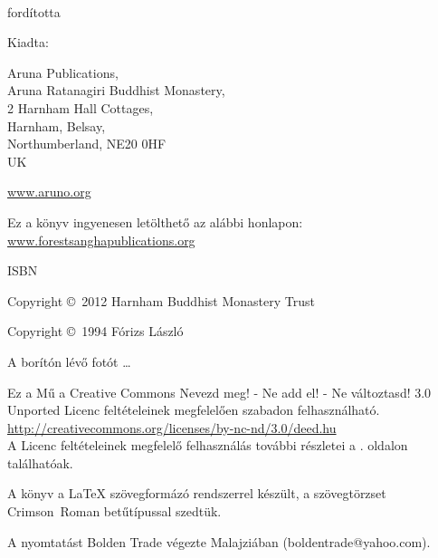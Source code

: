 {\small\setlength{\parskip}{0.8em}\setlength{\parindent}{0em}%
{\raggedright%

\thetitle\\
fordította \theauthor

Kiadta:

Aruna Publications,\\
Aruna Ratanagiri Buddhist Monastery,\\
2 Harnham Hall Cottages,\\
Harnham, Belsay,\\
Northumberland, NE20 0HF\\
UK

\href{http://aruno.org}{www.aruno.org}

Ez a könyv ingyenesen letölthető az alábbi honlapon:\\
\href{http://forestsanghapublications.org/}{www.forestsanghapublications.org}

ISBN \theISBN

Copyright \copyright\ 2012 Harnham Buddhist Monastery Trust

Copyright \copyright\ 1994 Fórizs László

A borítón lévő fotót \ldots

\vfill

{\footnotesize

Ez a Mű a Creative Commons Nevezd meg! - Ne add el! - Ne változtasd! 3.0 Unported Licenc feltételeinek megfelelően szabadon felhasználható.\\
\href{http://creativecommons.org/licenses/by-nc-nd/3.0/deed.hu}{http://creativecommons.org/licenses/by-nc-nd/3.0/deed.hu}\\

A Licenc feltételeinek megfelelő felhasználás további részletei a \pageref{copyright-details}. oldalon találhatóak.

A könyv a {\selectfont\LaTeX} szövegformázó rendszerrel készült, a szövegtörzset Crimson~Roman betűtípussal szedtük.

\theEditionInfo

A nyomtatást Bolden Trade végezte Malajziában (boldentrade@yahoo.com).

}

}}


